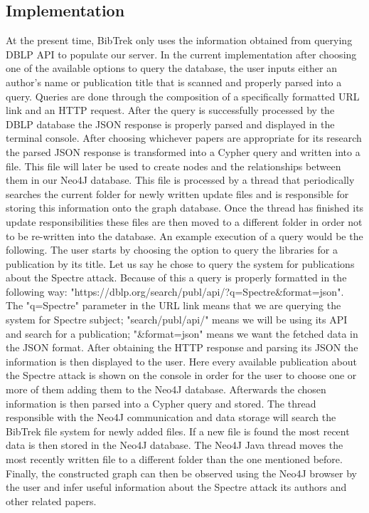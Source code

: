 \documentclass{article}
\begin{document}
\subsection{Implementation}
At the present time, BibTrek only uses the information obtained from querying DBLP API to populate our server. In the current implementation after choosing one of the available options to query the database, the user inputs either an author's name or publication title that is scanned and properly parsed into a query. Queries are done through the composition of a specifically formatted URL link and an HTTP request. After the query is successfully processed by the DBLP database the JSON response is properly parsed and displayed in the terminal console. After choosing whichever papers are appropriate for its research the parsed JSON response is transformed into a Cypher query and written into a file. This file will later be used to create nodes and the relationships between them in our Neo4J database. This file is processed by a thread that periodically searches the current folder for newly written update files and is responsible for storing this information onto the graph database. Once the thread has finished its update responsibilities these files are then moved to a different folder in order not to be re-written into the database. An example execution of a query would be the following. The user starts by choosing the option to query the libraries for a publication by its title. Let us say he chose to query the system for publications about the Spectre attack. Because of this a query is properly formatted in the following way: "https://dblp.org/search/publ/api/?q=Spectre&format=json". The "q=Spectre" parameter in the URL link means that we are querying the system for Spectre subject; "search/publ/api/" means we will be using its API and search for a publication; "&format=json" means we want the fetched data in the JSON format. After obtaining the HTTP response and parsing its JSON the information is then displayed to the user. Here every available publication about the Spectre attack is shown on the console in order for the user to choose one or more of them adding them to the Neo4J database. Afterwards the chosen information is then parsed into a Cypher query and stored. The thread responsible with the Neo4J communication and data storage will search the BibTrek file system for newly added files. If a new file is found the most recent data is then stored in the Neo4J database. The Neo4J Java thread moves the most recently written file to a different folder than the one mentioned before. Finally, the constructed graph can then be observed using the Neo4J browser by the user and infer useful information about the Spectre attack its authors and other related papers.
\end{document}
